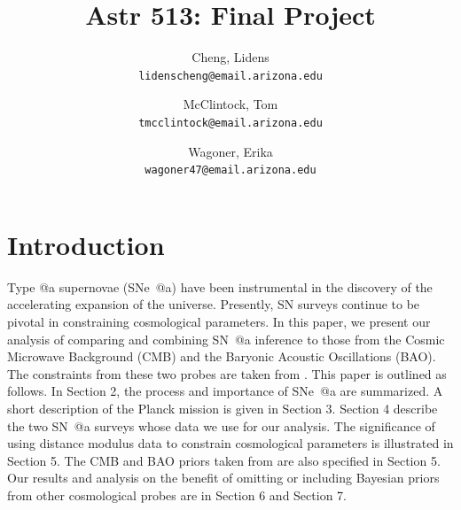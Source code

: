 \documentclass[12pt,a4paper]{article}
\author{
  Cheng, Lidens\\
  \texttt{lidenscheng@email.arizona.edu}
  \and
  McClintock, Tom\\
  \texttt{tmcclintock@email.arizona.edu}
  \and
  Wagoner, Erika\\
  \texttt{wagoner47@email.arizona.edu}
}
\title{Astr 513: Final Project}
\makeatletter
\newcommand*{\rom}[1]{\expandafter\@slowromancap\romannumeral #1@}
\newcommand{\sn}{\mbox{SN}}
\newcommand{\sna}{\mbox{SN \rom{1}a}}
\newcommand{\snea}{\mbox{SNe \rom{1}a}}
\makeatother
\begin{document}
\maketitle

\section{Introduction}
\label{sec:Intro}
Type \rom{1}a supernovae (\snea{}) have been instrumental in the discovery of the accelerating expansion of the universe. Presently, {\sn} surveys continue to be pivotal in constraining cosmological parameters. In this paper, we present our analysis of comparing and combining {\sna} inference to those from the Cosmic Microwave Background (CMB) and the Baryonic Acoustic Oscillations (BAO). The constraints from these two probes are taken from \citet{planck2013}. This paper is outlined as follows. In Section 2, the process and importance of {\snea} are summarized. A short description of the Planck mission is given in Section 3. Section 4 describe the two {\sna} surveys whose data we use for our analysis. The significance of using distance modulus data to constrain cosmological parameters is illustrated in Section 5. The CMB and BAO priors taken from \citet{planck2013} are also specified in Section 5. Our results and analysis on the benefit of omitting or including Bayesian priors from other cosmological probes are in Section 6 and Section 7.  
\end{document}
